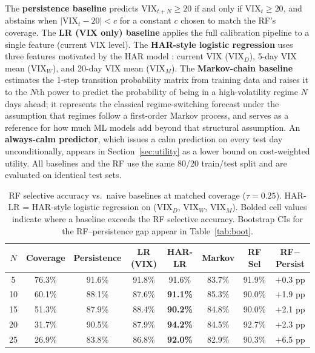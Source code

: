 \documentclass[12pt]{article}
\begin{document}
The \textbf{persistence baseline} predicts $\text{VIX}_{t+N} \geq 20$ if and only if $\text{VIX}_t \geq 20$, and abstains when $|\text{VIX}_t - 20| < c$ for a constant $c$ chosen to match the RF's coverage. The \textbf{LR (VIX only) baseline} applies the full calibration pipeline to a single feature (current VIX level). The \textbf{HAR-style logistic regression} uses three features motivated by the HAR model \citep{corsi2009}: current VIX ($\text{VIX}_D$), 5-day VIX mean ($\text{VIX}_W$), and 20-day VIX mean ($\text{VIX}_M$). The \textbf{Markov-chain baseline} estimates the 1-step transition probability matrix from training data and raises it to the $N$th power to predict the probability of being in a high-volatility regime $N$ days ahead; it represents the classical regime-switching forecast under the assumption that regimes follow a first-order Markov process, and serves as a reference for how much ML models add beyond that structural assumption. An \textbf{always-calm predictor}, which issues a calm prediction on every test day unconditionally, appears in Section~\ref{sec:utility} as a lower bound on cost-weighted utility. All baselines and the RF use the same 80/20 train/test split and are evaluated on identical test sets.

\begin{table}[H]
\centering
\caption{RF selective accuracy vs.\ naive baselines at matched coverage ($\tau = 0.25$). HAR-LR = HAR-style logistic regression on (VIX$_D$, VIX$_W$, VIX$_M$). Bolded cell values indicate where a baseline exceeds the RF selective accuracy. Bootstrap CIs for the RF--persistence gap appear in Table~\ref{tab:boot}.}
\label{tab:baselines}
\begin{tabular}{cccccccc}
\toprule
$N$ & Coverage & Persistence & LR (VIX) & \textbf{HAR-LR} & Markov & RF Sel & RF$-$Persist \\
\midrule
5  & 76.3\% & 91.6\% & 91.8\% & 91.6\% & 83.7\% & 91.9\% & $+$0.3 pp \\
10 & 60.1\% & 88.1\% & 87.6\% & \textbf{91.1\%} & 85.3\% & 90.0\% & $+$1.9 pp \\
15 & 51.3\% & 87.9\% & 88.4\% & \textbf{90.2\%} & 84.8\% & 90.0\% & $+$2.1 pp \\
20 & 31.7\% & 90.5\% & 87.9\% & \textbf{94.2\%} & 84.5\% & 92.7\% & $+$2.3 pp \\
25 & 26.9\% & 83.8\% & 86.8\% & \textbf{92.0\%} & 82.9\% & 90.3\% & $+$6.5 pp \\
\bottomrule
\end{tabular}
\end{table}
\end{document}
